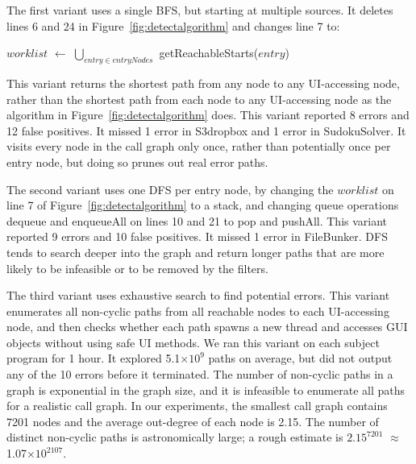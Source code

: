 The first variant uses a single BFS, but starting at multiple sources.  It deletes
lines 6 and 24 in Figure~\ref{fig:detectalgorithm} and changes line
7 to:

\vspace{0.2mm}
$\mathit{worklist}$ $\leftarrow$ $\bigcup_{\mathit{entry} \in \mathit{entryNodes}}$ getReachableStarts($\mathit{entry}$)
\vspace{0.2mm}

\noindent This variant returns the shortest path from any  node
to any UI-accessing node, rather than the shortest path from each
 node to any UI-accessing node as the algorithm in
Figure~\ref{fig:detectalgorithm} does.
This variant reported 8 errors and 12 false positives.   It missed 1 error in S3dropbox and 1 error in
SudokuSolver.
It visits every node in the call graph only once, rather than potentially
once per entry node, but doing so prunes out real error paths.

The second variant uses one DFS per entry node, by changing
the $\mathit{worklist}$ on line 7 of Figure~\ref{fig:detectalgorithm} to
a stack, and changing queue operations dequeue and enqueueAll
on lines 10 and 21
to pop and pushAll.
This variant reported 9 errors and 10 false positives.  It missed 1 error in FileBunker.
DFS tends to search deeper into the graph and return longer paths that are
more likely to be infeasible or to be removed by the filters.

The third variant uses exhaustive search to find potential errors. This variant
enumerates all non-cyclic paths from all reachable  nodes
to each UI-accessing node, and then checks whether each
path spawns a new thread and accesses GUI objects without using safe UI methods.
We ran this variant on each subject program for 1 hour.  It explored 5.1$\times$$10^9$ paths
on average, but did not output any of the 10 errors before it terminated.
The number of non-cyclic paths in a graph is exponential in the graph size,
and it is infeasible to enumerate all paths for a realistic call graph.
In our experiments, the smallest call graph contains 7201 nodes and the average out-degree
of each node is 2.15.  The number of distinct
non-cyclic paths is astronomically large; a rough estimate is
$2.15^{7201}$ $\approx$ 1.07$\times$$10^{2107}$.


